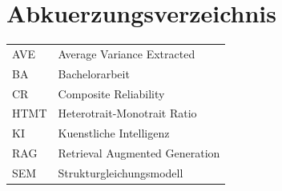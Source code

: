 \chapter*{Abkuerzungsverzeichnis}

\begin{tabular}{ll}
  AVE     & Average Variance Extracted \\
  BA      & Bachelorarbeit \\
  CR      & Composite Reliability \\
  HTMT    & Heterotrait-Monotrait Ratio \\
  KI      & Kuenstliche Intelligenz \\
  RAG     & Retrieval Augmented Generation \\
  SEM     & Strukturgleichungsmodell \\
\end{tabular}
